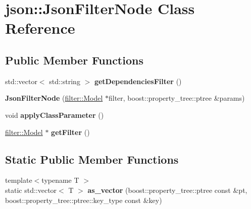 \hypertarget{classjson_1_1_json_filter_node}{}\section{json\+:\+:Json\+Filter\+Node Class Reference}
\label{classjson_1_1_json_filter_node}
\subsection*{Public Member Functions}
\begin{DoxyCompactItemize}
\item 
\mbox{\label{classjson_1_1_json_filter_node_a9df5d3a1c9309fbc3f59bf7929b504f0}} 
std\+::vector$<$ std\+::string $>$ {\bfseries get\+Dependencies\+Filter} ()
\item 
\mbox{\label{classjson_1_1_json_filter_node_a7ed12a9049b701ecab0485f572fd4703}} 
{\bfseries Json\+Filter\+Node} (\hyperlink{classfilter_1_1_model}{filter\+::\+Model} $\ast$filter, boost\+::property\+\_\+tree\+::ptree \&params)
\item 
\mbox{\label{classjson_1_1_json_filter_node_a251b7ce3ae1aa2f32c34571271f5c3d4}} 
void {\bfseries apply\+Class\+Parameter} ()
\item 
\mbox{\label{classjson_1_1_json_filter_node_aa06d4f8ac48c5c39c6708ac84e04fd7b}} 
\hyperlink{classfilter_1_1_model}{filter\+::\+Model} $\ast$ {\bfseries get\+Filter} ()
\end{DoxyCompactItemize}
\subsection*{Static Public Member Functions}
\begin{DoxyCompactItemize}
\item 
\mbox{\label{classjson_1_1_json_filter_node_acdcd269942e402495740a6b84eeca26c}} 
{\footnotesize template$<$typename T $>$ }\\static std\+::vector$<$ T $>$ {\bfseries as\+\_\+vector} (boost\+::property\+\_\+tree\+::ptree const \&pt, boost\+::property\+\_\+tree\+::ptree\+::key\+\_\+type const \&key)
\end{DoxyCompactItemize}
